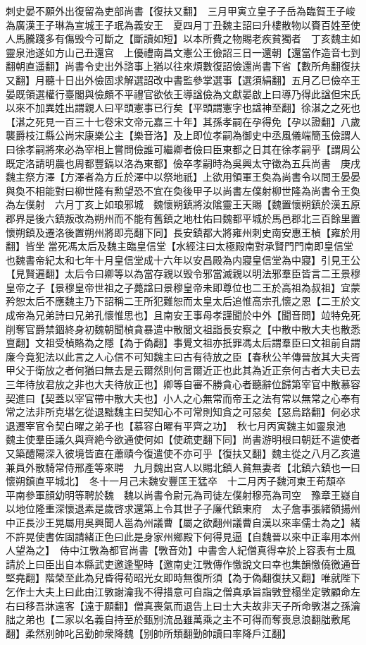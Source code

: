刺史晏不願外出復留為吏部尚書【復扶又翻】　三月甲寅立皇子子岳為臨賀王子峻為廣漢王子琳為宣城王子珉為義安王　夏四月丁丑魏主詔曰升樓散物以賚百姓至使人馬騰踐多有傷毁今可斷之【斷讀如短】以本所費之物賜老疾貧獨者　丁亥魏主如靈泉池遂如方山己丑還宫　上優禮南昌文憲公王儉詔三日一還朝【還當作造音七到翻朝直遥翻】尚書令史出外諮事上猶以往來煩數復詔儉還尚書下省【數所角翻復扶又翻】月聽十日出外儉固求解選詔改中書監參掌選事【選須絹翻】五月乙巳儉卒王晏既領選權行臺閣與儉頗不平禮官欲依王導諡儉為文獻晏啟上曰導乃得此諡但宋氏以來不加異姓出謂親人曰平頭憲事已行矣【平頭謂憲字也諡神至翻】徐湛之之死也【湛之死見一百三十七卷宋文帝元嘉三十年】其孫孝嗣在孕得免【孕以證翻】八歲襲爵枝江縣公尚宋康樂公主【樂音洛】及上即位孝嗣為御史中丞風儀端簡玉儉謂人曰徐孝嗣將來必為宰相上嘗問儉誰可繼卿者儉曰臣東都之日其在徐孝嗣乎【謂周公既定洛請明農也周都豐鎬以洛為東都】儉卒孝嗣時為吳興太守徵為五兵尚書　庚戌魏主祭方澤【方澤者為方丘於澤中以祭地祇】上欲用領軍王奐為尚書令以問王晏晏與奐不相能對曰柳世隆有勲望恐不宜在奐後甲子以尚書左僕射柳世隆為尚書令王奐為左僕射　六月丁亥上如琅邪城　魏懷朔鎮將汝隂靈王天賜【魏置懷朔鎮於漢五原郡界是後六鎮叛改為朔州而不能有舊鎮之地杜佑曰魏都平城於馬邑郡北三百餘里置懷朔鎮及遷洛後置朔州將即亮翻下同】長安鎮都大將雍州刺史南安惠王楨【雍於用翻】皆坐當死馮太后及魏主臨皇信堂【水經注曰太極殿南對承賢門門南即皇信堂也魏書帝紀太和七年十月皇信堂成十六年以安昌殿為内寢皇信堂為中寢】引見王公【見賢遍翻】太后令曰卿等以為當存親以毁令邪當滅親以明法邪羣臣皆言二王景穆皇帝之子【景穆皇帝世祖之子薨諡曰景穆皇帝未即尊位也二王於高祖為叔祖】宜蒙矜恕太后不應魏主乃下詔稱二王所犯難恕而太皇太后追惟高宗孔懷之恩【二王於文成帝為兄弟詩曰兄弟孔懷惟思也】且南安王事母孝謹聞於中外【聞音問】竝特免死削奪官爵禁錮終身初魏朝聞楨貪暴遣中散閭文祖詣長安察之【中散中散大夫也散悉亶翻】文祖受楨賂為之隱【為于偽翻】事覺文祖亦扺罪馮太后謂羣臣曰文祖前自謂廉今竟犯法以此言之人心信不可知魏主曰古有待放之臣【春秋公羊傳晉放其大夫胥甲父于衛放之者何猶曰無去是云爾然則何言爾近正也此其為近正奈何古者大夫已去三年待放君放之非也大夫待放正也】卿等自審不勝貪心者聽辭位歸第宰官中散慕容契進曰【契蓋以宰官帶中散大夫也】小人之心無常而帝王之法有常以無常之心奉有常之法非所克堪乞從退黜魏主曰契知心不可常則知貪之可惡矣【惡烏路翻】何必求退遷宰官令契白曜之弟子也【慕容白曜有平齊之功】　秋七月丙寅魏主如靈泉池　魏主使羣臣議久與齊絶今欲通使何如【使疏吏翻下同】尚書游明根曰朝廷不遣使者又築醴陽深入彼境皆直在蕭賾今復遣使不亦可乎【復扶又翻】魏主從之八月乙亥遣兼員外散騎常侍邢產等來聘　九月魏出宫人以賜北鎮人貧無妻者【北鎮六鎮也一曰懷朔鎮直平城北】　冬十一月己未魏安豐匡王猛卒　十二月丙子魏河東王苟頹卒　平南參軍顔幼明等聘於魏　魏以尚書令尉元為司徒左僕射穆亮為司空　豫章王嶷自以地位隆重深懷退素是歲啓求還第上令其世子子廉代鎮東府　太子詹事張緒領揚州中正長沙王晃屬用吳興聞人邕為州議曹【屬之欲翻州議曹自漢以來率儒士為之】緒不許晃使書佐固請緒正色曰此是身家州鄉殿下何得見逼【自魏晉以來中正率用本州人望為之】　侍中江斆為都官尚書【斆音効】中書舍人紀僧真得幸於上容表有士風請於上曰臣出自本縣武吏邀逢聖時【邀南史江斆傳作憿說文曰幸也集韻憿僥徼通音堅堯翻】階榮至此為兒昏得荀昭光女即時無復所須【為于偽翻復扶又翻】唯就陛下乞作士大夫上曰此由江斆謝瀹我不得措意可自詣之僧真承旨詣斆登榻坐定斆顧命左右曰移吾牀遠客【遠于願翻】僧真喪氣而退告上曰士大夫故非天子所命斆湛之孫瀹朏之弟也【二家以名義自持至於甄别流品雖萬乘之主不可得而奪喪息浪翻朏敷尾翻】柔然别帥叱呂勤帥衆降魏【别帥所類翻勤帥讀曰率降戶江翻】

